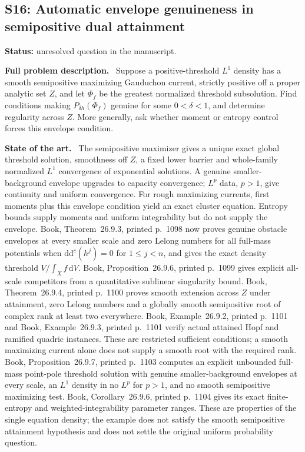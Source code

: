 \documentclass[11pt]{article}
\newcommand{\ddc}{\mathrm d\mathrm d^c}
\newcommand{\field}[1]{\par\medskip\noindent\textbf{#1.}\ }
\begin{document}
\subsection{S16: Automatic envelope genuineness in semipositive dual attainment}
\label{S16}
\noindent\textbf{Status:} unresolved question in the manuscript.
\field{Full problem description} Suppose a positive-threshold $L^1$ density has a smooth semipositive maximizing Gauduchon current, strictly positive off a proper analytic set $Z$, and let $\Phi_f$ be the greatest normalized threshold subsolution. Find conditions making $P_{\delta h}(\Phi_f)$ genuine for some $0<\delta<1$, and determine regularity across $Z$. More generally, ask whether moment or entropy control forces this envelope condition.
\field{State of the art} The semipositive maximizer gives a unique exact global threshold solution, smoothness off $Z$, a fixed lower barrier and whole-family normalized $L^1$ convergence of exponential solutions. A genuine smaller-background envelope upgrades to capacity convergence; $L^p$ data, $p>1$, give continuity and uniform convergence. For rough maximizing currents, first moments plus this envelope condition yield an exact cluster equation. Entropy bounds supply moments and uniform integrability but do not supply the envelope. Book, Theorem~26.9.3, printed p.~1098 now proves genuine obstacle envelopes at every smaller scale and zero Lelong numbers for all full-mass potentials when $\ddc(h^j)=0$ for $1\leq j<n$, and gives the exact density threshold $V/\int_Xf\,\mathrm{d}V$. Book, Proposition~26.9.6, printed p.~1099 gives explicit all-scale competitors from a quantitative sublinear singularity bound. Book, Theorem~26.9.4, printed p.~1100 proves smooth extension across $Z$ under attainment, zero Lelong numbers and a globally smooth semipositive root of complex rank at least two everywhere. Book, Example~26.9.2, printed p.~1101 and Book, Example~26.9.3, printed p.~1101 verify actual attained Hopf and ramified quadric instances. These are restricted sufficient conditions; a smooth maximizing current alone does not supply a smooth root with the required rank. Book, Proposition~26.9.7, printed p.~1103 computes an explicit unbounded full-mass point-pole threshold solution with genuine smaller-background envelopes at every scale, an $L^1$ density in no $L^p$ for $p>1$, and no smooth semipositive maximizing test. Book, Corollary~26.9.6, printed p.~1104 gives its exact finite-entropy and weighted-integrability parameter ranges. These are properties of the single equation density; the example does not satisfy the smooth semipositive attainment hypothesis and does not settle the original uniform probability question.
\end{document}

